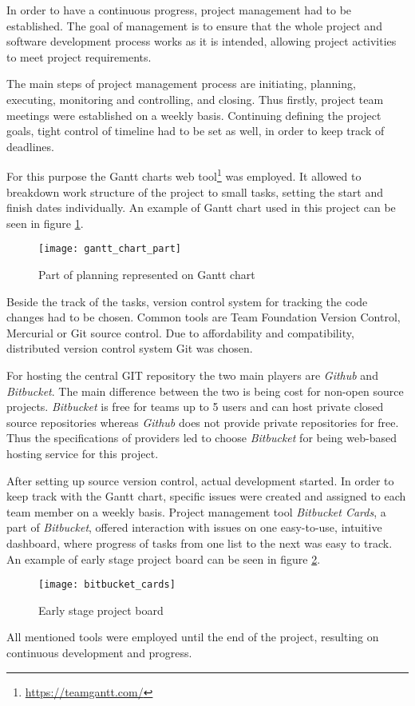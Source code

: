 In order to have a continuous progress, project management had to be established. The goal of management is to ensure that the whole project and software development process works as it is intended, allowing project activities to meet project requirements.

The main steps of project management process are initiating, planning, executing, monitoring and controlling, and closing. Thus firstly, project team meetings were established on a weekly basis. Continuing defining the project goals, tight control of timeline had to be set as well, in order to keep track of deadlines.

For this purpose the Gantt charts web tool\footnote{\url{https://teamgantt.com/}} was employed. It allowed to breakdown work structure of the project to small tasks, setting the start and finish dates individually. An example of Gantt chart used in this project can be seen in figure \ref{fig:gannt_example}.

\begin{figure}[ht!]
	\centering
	\texttt{[image: gantt\_chart\_part]}
	\caption{Part of planning represented on Gantt chart}
	\label{fig:gannt_example}
\end{figure}

Beside the track of the tasks, version control system for tracking the code changes had to be chosen. Common tools are Team Foundation Version Control, Mercurial or Git source control. Due to affordability and compatibility, distributed version control system Git was chosen. 

For hosting the central GIT repository the two main players are \textit{Github} and \textit{Bitbucket}.
The main difference between the two is being cost for non-open source projects. \textit{Bitbucket} is free for teams up to 5 users and can host private closed source repositories whereas \textit{Github} does not provide private repositories for free. Thus the specifications of providers led to choose \textit{Bitbucket} for being web-based hosting service for this project.

After setting up source version control, actual development started. In order to keep track with the Gantt chart, specific issues were created and assigned to each team member on a weekly basis. Project management tool \textit{Bitbucket Cards}, a part of \textit{Bitbucket}, offered interaction with issues on one easy-to-use, intuitive dashboard, where progress of tasks from one list to the next was easy to track. An example of early stage project board can be seen in figure \ref{fig:bitcards}.

\begin{figure}[ht!]
	\centering
	\texttt{[image: bitbucket\_cards]}
	\caption{Early stage project board}
	\label{fig:bitcards}
\end{figure}

All mentioned tools were employed until the end of the project, resulting on continuous development and progress.